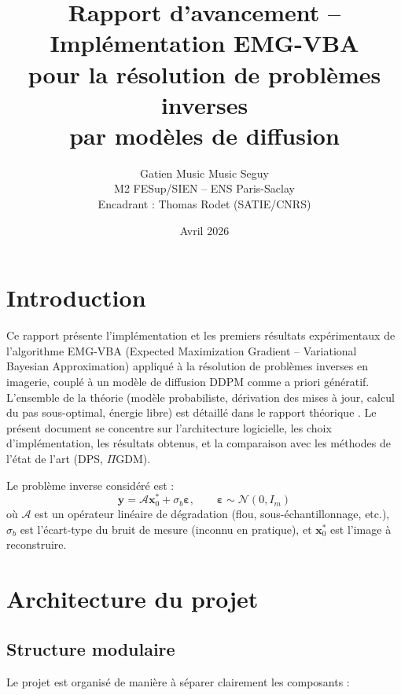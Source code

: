 \documentclass[12pt]{article}
\title{\textbf{Rapport d'avancement -- Implémentation EMG-VBA\\pour la résolution de problèmes inverses\\par modèles de diffusion}}
\author{Gatien Music Music Seguy \\ M2 FESup/SIEN -- ENS Paris-Saclay \\ Encadrant : Thomas Rodet (SATIE/CNRS)}
\date{Avril 2026}
\newcommand{\y}{\boldsymbol{y}}
\newcommand{\x}{\boldsymbol{x}}
\newcommand{\op}{\mathcal{A}}
\begin{document}
\maketitle
\tableofcontents
\newpage

\section{Introduction}

Ce rapport présente l'implémentation et les premiers résultats expérimentaux de l'algorithme EMG-VBA (Expected Maximization Gradient -- Variational Bayesian Approximation) appliqué à la résolution de problèmes inverses en imagerie, couplé à un modèle de diffusion DDPM comme a priori génératif. L'ensemble de la théorie (modèle probabiliste, dérivation des mises à jour, calcul du pas sous-optimal, énergie libre) est détaillé dans le rapport théorique \cite{rapport_theorique}. Le présent document se concentre sur l'architecture logicielle, les choix d'implémentation, les résultats obtenus, et la comparaison avec les méthodes de l'état de l'art (DPS, $\Pi$GDM).

Le problème inverse considéré est :
\begin{equation}
    \y = \op \x_0^* + \sigma_b \boldsymbol{\varepsilon}, \qquad \boldsymbol{\varepsilon} \sim \mathcal{N}(0, I_m)
    \label{eq:forward}
\end{equation}
où $\op$ est un opérateur linéaire de dégradation (flou, sous-échantillonnage, etc.), $\sigma_b$ est l'écart-type du bruit de mesure (inconnu en pratique), et $\x_0^*$ est l'image à reconstruire.

\section{Architecture du projet}

\subsection{Structure modulaire}

Le projet est organisé de manière à séparer clairement les composants :
\end{document}
